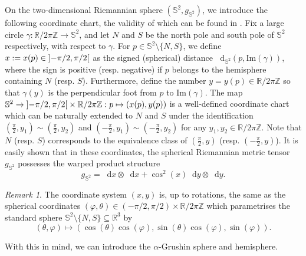 \documentclass[11pt,twoside,a4paper]{article}
\newcommand*\diff{\mathop{}\!\mathrm{d}}
\newcommand{\R}{\mathbb{R}}
\newcommand{\Z}{\mathbb{Z}}
\renewcommand{\S}{\mathbb{S}}
\renewcommand{\phi}{\varphi}
\theoremstyle{theorem}
\theoremstyle{definition}
\theoremstyle{remark}
\newtheorem{remark}[theorem]{Remark}
\theoremstyle{proof}
\begin{document}
On the two-dimensional Riemannian sphere $(\S^2, g_{\S^2})$, we introduce the following coordinate chart, the validity of which can be found in \cite{boscain-prandi-seri2016}.
Fix a large circle $\gamma:\R/2\pi\Z\to \S^2$,
and let $N$ and $S$ be the north pole and south pole of $\S^2$ respectively, with respect to $\gamma$. For $p\in \S^2\setminus\{N,S\}$,
we define $x := x(p) \in \ointerval{-\pi/2}{\pi/2}$ as the signed (spherical) distance $\diff_{\S^2}(p,\mathrm{Im}(\gamma))$,
where the sign is positive (resp. negative) if $p$ belongs to the hemisphere containing $N$ (resp. $S$).
Furthermore,
define the number $y=y(p)\in \R/2\pi\Z$ so that $\gamma(y)$ is the perpendicular foot from $p$ to $\mathrm{Im}(\gamma)$. The map $\S^2 \to \ointerval{-\pi/2}{\pi/2}\times \R/2\pi\Z  : p \mapsto (x(p), y(p))$ is a well-defined coordinate chart which can be naturally extended to $N$ and $S$ under the identification
$(\frac{\pi}{2},y_1) \sim (\frac{\pi}{2},y_2)$ and $(-\frac{\pi}{2},y_1) \sim (-\frac{\pi}{2},y_2)$ for any $y_1,y_2\in \R/2\pi\Z$. Note that $N$ (resp. $S$) corresponds to the equivalence class of $(\frac{\pi}{2},y)$ (resp. $(-\frac{\pi}{2},y)$). It is easily shown that in these coordinates, the spherical Riemannian metric tensor $g_{\S^2}$ possesses the warped product structure
\[
g_{\S^2} = \diff x \otimes \diff x + \cos^2(x) \diff y \otimes \diff y.
\]
\begin{remark}
The coordinate system $(x, y)$ is, up to rotations, the same as the spherical coordinates $(\phi,\theta) \in  (-\pi/2, \pi/2)\times \R / 2\pi\Z$
which parametrises the standard sphere $\S^2 \setminus \{N, S\}\subseteq \R^3$ by
\[(\theta,\phi)\mapsto (\cos(\theta)\cos(\phi),
\sin(\theta)\cos(\phi),\sin(\phi)).\]
\end{remark}
With this in mind, we can introduce the $\alpha$-Grushin sphere and hemisphere.
\end{document}
